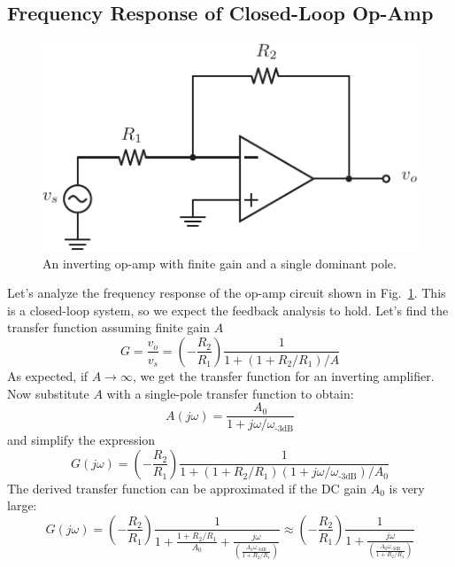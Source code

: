 \subsection{Frequency Response of Closed-Loop Op-Amp}
\begin{figure}[tb]
\centering
\includegraphics[scale=1]{opamp_invert_gain}
\caption{An inverting op-amp with finite gain and a single dominant pole.}
\label{fig:opamp_invert_gain}
\end{figure}
Let's analyze the frequency response of the op-amp circuit shown in Fig.~\ref{fig:opamp_invert_gain}.  This is a closed-loop system, so we expect the feedback analysis to hold.  Let's find the transfer function assuming finite gain $A$
    \begin{equation}
        G = \frac{v_o}{v_s} = \left(-\frac{R_2}{R_1}\right) \frac{1}{1 + (1+R_2/R_1)/A}
    \end{equation}
As expected, if $A \rightarrow \infty$, we get the transfer function for an inverting amplifier.  Now  substitute $A$ with a single-pole transfer function to obtain:
    \begin{equation} 
        A(j\omega) = \frac{A_0}{1 + j\omega/\omega_{\text{-3dB}}}
    \end{equation}
and simplify the expression 
    \begin{equation}
        G(j\omega) = \left(-\frac{R_2}{R_1}\right)  \frac{1}{1 + (1+R_2/R_1)(1+ j\omega/\omega_\text{-3dB})/A_0}
    \end{equation}
The derived transfer function can be approximated if the DC gain $A_0$ is very large:
    \begin{equation}
        G(j\omega) = \left(-\frac{R_2}{R_1}\right)  \frac{1}{1 + \frac{1+R_2/R_1}{A_0} + \frac{j\omega}{\left( \frac{A_0 \omega_\text{-3dB}}{1 + R_2/R_1} \right)}} \approx \left(-\frac{R_2}{R_1}\right)\frac{1}{1 + \frac{j\omega}{\left( \frac{A_0 \omega_\text{-3dB}}{1 + R_2/R_1} \right)}}
    \end{equation}
